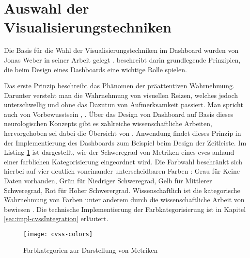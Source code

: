 \section{Auswahl der Visualisierungstechniken}
\label{sec:auswahlDerVisualisierungstechniken}
Die Basis für die Wahl der Visualisierungstechniken im Dashboard wurden von Jonas Weber in seiner Arbeit gelegt \autocite{weberEvaluationDashboardTechniques}. \citeauthor{weberEvaluationDashboardTechniques} beschreibt darin grundlegende Prinzipien, die beim Design eines Dashboards eine wichtige Rolle spielen.
\par Das erste Prinzip beschreibt das Phänomen der präattentiven Wahrnehmung. Darunter versteht man die Wahrnehmung von visuellen Reizen, welches jedoch unterschwellig und ohne das Dazutun von Aufmerksamkeit passiert. Man spricht auch von Vorbewusstsein \autocite{PraeattentiveWahrnehmung}, \autocite{mallotWahrnehmungPraeattentiveIm2021}. Über das Design von Dashboard auf Basis dieses neurologischen Konzepts gibt es zahlreiche wissenschaftliche Arbeiten, hervorgehoben sei dabei die Übersicht von \citeauthor{barrera-leonHowPreattentiveProcess2023} \autocite{barrera-leonHowPreattentiveProcess2023}. Anwendung findet dieses Prinzip in der Implementierung des Dashboards zum Beispiel beim Design der Zeitleiste. Im Listing \ref{fig:cvss-colors} ist dargestellt, wie der Schweregrad von Metriken eines \glspl{cve} anhand einer farblichen Kategorisierung eingeordnet wird. Die Farbwahl beschränkt sich hierbei auf vier deutlich voneinander unterscheidbaren Farben : Grau für Keine Daten vorhanden, Grün für Niedriger Schweregrad, Gelb für Mittlerer Schweregrad, Rot für Hoher Schwerergrad. Wissenschaftlich ist die kategorische Wahrnehmung von Farben unter anderem durch die wissenschaftliche Arbeit von \citeauthor{cliffordColorCategoriesAffect2010} bewiesen \autocite{cliffordColorCategoriesAffect2010}. Die technische Implementierung der Farbkategorisierung ist in Kapitel \ref{sec:impl-cvssIntegration} erläutert.
%
\begin{figure}[H]
    \centering
    \texttt{[image: cvss-colors]}
    \caption{Farbkategorien zur Darstellung von Metriken}
    \label{fig:cvss-colors}
\end{figure}
%
